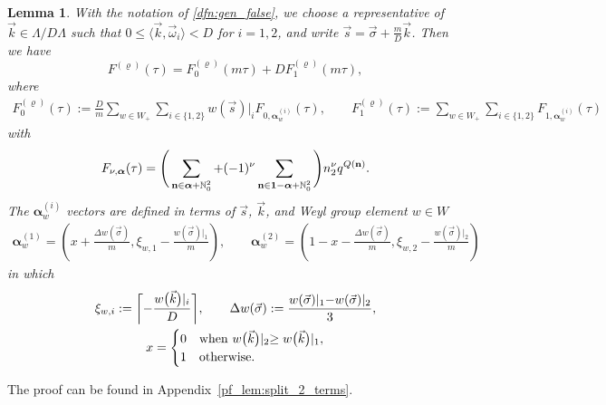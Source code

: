 \documentclass[10pt,a4paper]{amsart}
\def\bos{\varrho}
\def\bal{\boldsymbol{\alpha}}
\newtheorem{lem}[thm]{Lemma}
\theoremstyle{definition}
\numberwithin{equation}{section}
\begin{document}
\begin{lem}\label{lem:split_2_terms}
	With the notation of \eqref{dfn:gen_false}, we choose a representative of $\vec k\in \Lambda/D\Lambda$ such that $0\leq \langle \vec k, \vec\omega_i\rangle <D$ for $i=1,2$, and write $\vec{s}=\vec{\sigma}+\frac{m}{D}\vec{k}$.
 Then we have
	\begin{equation}\label{Section2-Fsplit}
		F^{(\bos)}(\tau) =
		F_{0}^{(\bos)}(m\tau)+D F_{1}^{\left(\bos\right)}(m\tau),
	\end{equation}
	where
	\begin{gather}\label{def:Fiq2_1}
			F_{0}^{\left( \bos \right)}( \tau)
			:= \frac{D}{m}\sum_{w\in W_+}\sum_{i \in \{1,2\}} w(\vec s)\lvert_i
			F_{0,\bal^{(i)}_w}(\tau),\qquad
			F_{1}^{\left( \bos \right)}( \tau) :=\sum_{w\in W_+}\sum_{i \in \{1,2\}}
			F_{1,\bal^{(i)}_w}(\tau)
	\end{gather}
	with
	\begin{equation}\label{def:Fiq2_1-comp}
		F_{\nu,\bal}(\tau) = \Bigg( \sum_{\mathbf{n}\in \bal+\mathbb{N}_{0}^{2}}+(-1)^\nu\sum_{\mathbf{n}\in {\bf 1}- \bal+\mathbb{N}_{0}^{2}} \Bigg) n_2^\nu q^{Q( \mathbf{n})}.
	\end{equation}
	The $\bal^{(i)}_{w}$ vectors are defined in terms of $\vec{s}$, $\vec{k}$, and Weyl group element $w\in W$
	\begin{gather}
		\bal_w^{(1)}=
		\left(x+ \frac{\Delta w(\vec{\sigma}) }{m},
		\xi_{w,1} - \frac{w(\vec{\sigma})\lvert_1}{m}\right), \qquad
		\bal_w^{(2)}=
		\left(1- x-\frac{\Delta w(\vec{\sigma}) }{m},
		\xi_{w,2} - \frac{w(\vec{\sigma})\lvert_2}{m}\right)
		\label{eq:alphawidef0A}
	\end{gather}
	in which
	\begin{gather*}
{ \xi_{w,i}:= \biggl\lceil - \frac{w\bigl(\vec{k}\bigr)\vert_i}{D} \biggr\rceil }, \qquad \Delta w(\vec{\sigma}) : = \frac{w(\vec{\sigma})\lvert_1-w(\vec{\sigma})\lvert_2 }{3}, \\
		x= \begin{cases} 0 & {\rm when}\ w\bigl(\vec{k}\bigr)\lvert_2\geq w\bigl(\vec{k}\bigr)\lvert_1, \\ 1 & {\rm otherwise}.
		\end{cases}
	\end{gather*}
\end{lem}
The proof can be found in Appendix~\ref{pf_lem:split_2_terms}.
\end{document}
